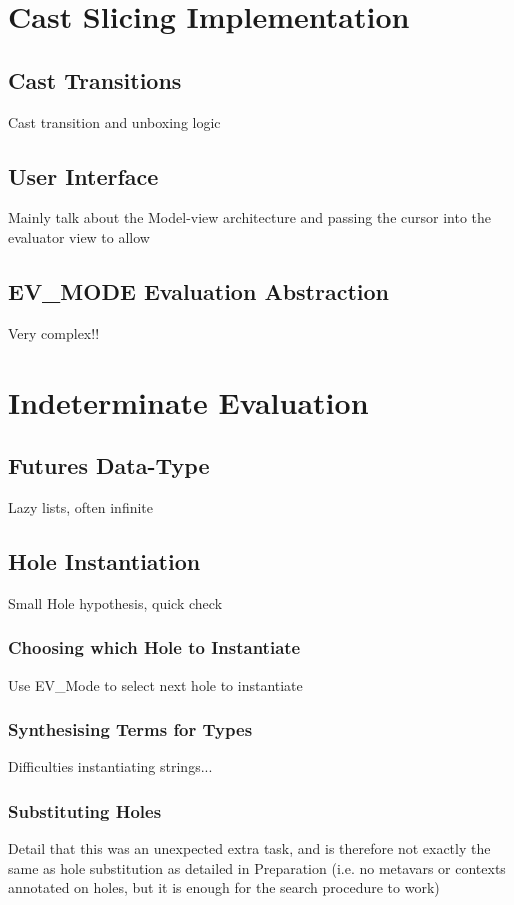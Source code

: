 \section{Cast Slicing Implementation}\label{sec:CastSlicingImplementation}
\subsection{Cast Transitions}

Cast transition and unboxing logic

\subsection{User Interface}
Mainly talk about the Model-view architecture and passing the cursor into the evaluator view to allow 


\subsection{EV\_MODE Evaluation Abstraction}
Very complex!!

\section{Indeterminate Evaluation}\label{sec:IndetEval}
\subsection{Futures Data-Type}\label{sec:Futures}
Lazy lists, often infinite
\subsection{Hole Instantiation}\label{sec:HoleInstantiation}
Small Hole hypothesis, quick check


\subsubsection{Choosing which Hole to Instantiate}
Use EV\_Mode to select next hole to instantiate

\subsubsection{Synthesising Terms for Types}
Difficulties instantiating strings...

\subsubsection{Substituting Holes}\label{sec:HoleSubstitutionImplementation}
Detail that this was an unexpected extra task, and is therefore not exactly the same as hole substitution as detailed in Preparation (i.e. no metavars or contexts annotated on holes, but it is enough for the search procedure to work)

